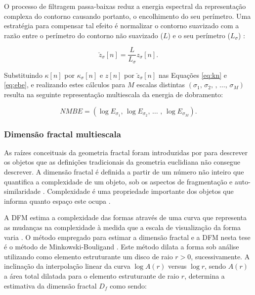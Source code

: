 O processo de filtragem passa-baixas reduz a energia espectral da representação complexa do contorno causando portanto, o encolhimento do seu perímetro. Uma estratégia para compensar tal efeito é normalizar o contorno suavizado com a razão entre o perímetro do contorno não suavizado ($L$) e o seu perímetro ($L_{\sigma}$) \cite{Cesar:1996,Costa:1997}:

\begin{equation}
\breve{z}_{\sigma}[n] = \frac{L}{L_{\sigma}}z_{\sigma}[n]\text{.}
\end{equation}

Substituindo $\kappa[n]$ por $\kappa_{\sigma}[n]$ e $z[n]$ por $\breve{z}_{\sigma}[n]$ nas Equações \ref{eq:kn} e \ref{eq:ebe}, e realizando estes cálculos para $M$ escalas distintas $(\sigma_1\text{, }\sigma_2\text{, }\text{, }\ldots\text{, }\sigma_M)$ resulta na seguinte representação multiescala da energia de dobramento:

\begin{equation}
NMBE = (\log{E_{\sigma_{1}}}\text{, }\log{E_{\sigma_{2}}}\text{, }\ldots \text{ , }\log{E_{\sigma_{M}}})\text{.}
\label{eq:nmbe}
\end{equation}
 
\subsubsection*{Dimensão fractal multiescala}


As raízes conceituais da geometria fractal foram introduzidas por  para descrever os objetos que as definições tradicionais da geometria euclidiana não consegue descrever. A dimensão fractal é definida a partir de um número não inteiro que quantifica a complexidade de um objeto, sob os aspectos de fragmentação e auto-similaridade \cite{Mandelbrot:2000}. Complexidade é uma propriedade importante dos objetos que informa quanto espaço este ocupa \cite{Costa:2009}. 


A \ac{DFM} estima a complexidade das formas através de uma curva que representa as mudanças na complexidade à medida que a escala de visualização da forma varia \cite{Florindo:2012}.
 O método empregado para estimar a dimensão fractal e a \ac{DFM} nesta tese é o método de Minkowski-Bouligand \cite{Costa:2009}. Este método dilata a forma sob análise utilizando como elemento estruturante um disco de raio $r > 0$, sucessivamente. A inclinação da interpolação linear da curva $\log{A(r)}$ versus $\log{r}$, sendo $A(r)$ a área total dilatada para o elemento estruturante de raio $r$, determina a estimativa da dimensão fractal $D_f$ como sendo:

